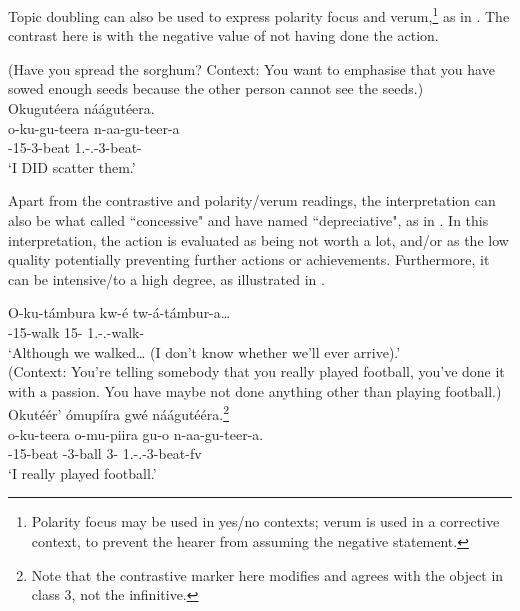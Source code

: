 \documentclass[output=paper]{langscibook}
\begin{document}
\z

Topic doubling can also be used to express polarity focus and verum,\footnote{Polarity focus may be used in yes/no contexts; verum is used in a corrective context, to prevent the hearer from assuming the negative statement.} as in . The contrast here is with the negative value of not having done the action.

\ea
\label{bkm:Ref98834331}
(Have you spread the sorghum? Context: You want to emphasise that you have sowed enough seeds because the other person cannot see the seeds.)\\
Okugutéera náágutéera.\\
\gll
o-ku-gu-teera  n-aa-gu-teer-a\\
\AUG{}-15-3\OM{}-beat  1\SG{}.\SM{}-\N{}.\PST{}-3\OM{}-beat-\FV{}\\
\glt
‘I DID scatter them.’\\


\z


Apart from the contrastive and polarity/verum readings, the interpretation can also be what \citet{Meeussen1967} called ``concessive" and \citet{vanderWalJerro2022a} have named ``depreciative", as in . In this interpretation, the action is evaluated as being not worth a lot, and/or as the low quality potentially preventing further actions or achievements. Furthermore, it can be intensive/to a high degree, as illustrated in .

\ea
\label{bkm:Ref98834437}
\gll
O-ku-támbura  kw-é  tw-á-támbur-a…\\
\AUG{}-15{}-walk  15-\CM{}  1\PL{}.\SM{}-\N{}.\PST{}-walk-\FV{}\\
\glt
‘Although we walked… (I don’t know whether we’ll ever arrive).’\\


\z
\largerpage[-1]\pagebreak
\ea
\label{bkm:Ref98834517}
(Context: You’re telling somebody that you really played football, you’ve done it with a passion. You have maybe not done anything other than playing football.)\\
Okutéér’ ómupííra gwé náágutééra.\footnote{Note that the contrastive marker here modifies and agrees with the object in class 3, not the infinitive.}\\
\gll
o-ku-teera  o-mu-piira  gu-o  n-aa-gu-teer-a.\\
\AUG{}-15-beat  \AUG{}-3-ball  3-\CM{}  1\SG{}.\SM{}-\N{}.\PST{}-3\OM{}-beat-fv\\
\glt
‘I really played football.’\\
\end{document}
